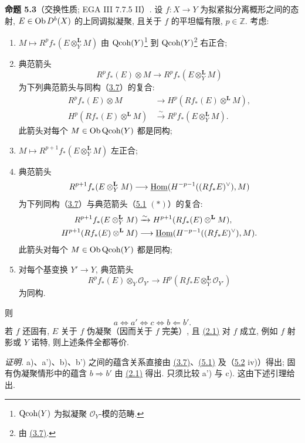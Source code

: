 \textbf{命题 5.3}（交换性质; EGA III 7.7.5 II）. 设 \(f:X\to Y\) 为拟紧拟分离概形之间的态射, \(E\in\operatorname{Ob} D^b(X)\) 的上同调拟凝聚, 且关于 \(f\) 的平坦幅有限, \(p\in\mathbb Z\). 考虑:
\begin{enumerate}[label=\alph*)]
\item \(M\mapsto R^pf_*(E\otimes_Y^{\mathbf L}M)\) 由 \(\operatorname{Qcoh}(Y)\)\footnote{\(\operatorname{Qcoh}(Y)\) 为拟凝聚 \(\mathcal O_Y\)-模的范畴.} 到 \(\operatorname{Qcoh}(Y)\)\footnote{由 \hyperlink{sga6.e03.prop.3-7}{(3.7)}.} 右正合;
\item[\(\mathrm a'\)] 典范箭头
\[
 R^pf_*(E)\otimes M
 \longrightarrow
 R^pf_*(E\otimes_Y^{\mathbf L}M)
\]
为下列典范箭头与同构（\hyperlink{sga6.e03.prop.3-7}{3.7}）的复合:
\[
\begin{aligned}
R^pf_*(E)\otimes M&\longrightarrow H^p(Rf_*(E)\otimes^{\mathbf L}M),\\
H^p(Rf_*(E)\otimes^{\mathbf L}M)&\xrightarrow{\sim}R^pf_*(E\otimes_Y^{\mathbf L}M).
\end{aligned}
\]
此箭头对每个 \(M\in\operatorname{Ob}\operatorname{Qcoh}(Y)\) 都是同构;
\item[\(\mathrm b\)] \(M\mapsto R^{p+1}f_*(E\otimes_Y^{\mathbf L}M)\) 左正合;
\item[\(\mathrm b'\)] 典范箭头
\[
 R^{p+1}f_*(E\otimes_Y^{\mathbf L}M)
 \longrightarrow
 \underline{\operatorname{Hom}}(H^{-p-1}((Rf_*E)^{\vee}),M)
\]
为下列同构（\hyperlink{sga6.e03.prop.3-7}{3.7}）与典范箭头（\hyperlink{sga6.e03.lem.5-1}{5.1} \((*)\)）的复合:
\[
\begin{aligned}
R^{p+1}f_*(E\otimes_Y^{\mathbf L}M)&\xrightarrow{\sim}H^{p+1}(Rf_*(E)\otimes^{\mathbf L}M),\\
H^{p+1}(Rf_*(E)\otimes^{\mathbf L}M)&\longrightarrow\underline{\operatorname{Hom}}(H^{-p-1}((Rf_*E)^{\vee}),M).
\end{aligned}
\]
此箭头对每个 \(M\in\operatorname{Ob}\operatorname{Qcoh}(Y)\) 都是同构;
\item[\(\mathrm c\)] 对每个基变换 \(Y'\to Y\), 典范箭头
\[
 R^pf_*(E)\otimes_Y\mathcal O_{Y'}
 \longrightarrow
 H^p(Rf_*E\otimes_Y^{\mathbf L}\mathcal O_{Y'})
\]
为同构.
\end{enumerate}
则
\[
 a\Longleftrightarrow a'\Longleftrightarrow c\Longleftrightarrow b\Longleftarrow b'.
\]
若 \(f\) 还固有, \(E\) 关于 \(f\) 伪凝聚（因而关于 \(f\) 完美）, 且 \hyperlink{sga6.e03.conj.2-1}{(2.1)} 对 \(f\) 成立, 例如 \(f\) 射影或 \(Y\) 诺特, 则上述条件全都等价.

\emph{证明.} a)、a')、b)、b') 之间的蕴含关系直接由 \hyperlink{sga6.e03.prop.3-7}{(3.7)}、\hyperlink{sga6.e03.lem.5-1}{(5.1)} 及（\hyperlink{sga6.e03.rem.5-2}{5.2} iv)）得出; 固有伪凝聚情形中的蕴含 \(b\Rightarrow b'\) 由 \hyperlink{sga6.e03.conj.2-1}{(2.1)} 得出. 只须比较 a') 与 c). 这由下述引理给出.

